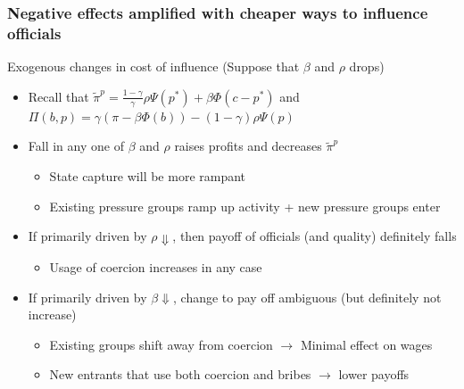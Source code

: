 \documentclass[aspectratio=169]{beamer}
\begin{document}
\begin{frame}
\frametitle{Negative effects amplified with cheaper ways to influence officials} 
Exogenous changes in cost of influence (Suppose that $\beta$ and $\rho$ drops)
\begin{itemize}\setlength\itemsep{3pt}
\item Recall that $\tilde{\pi}^p=\frac{1-\gamma}{\gamma}\rho\Psi(p^*)+\beta\Phi(c-p^*)$ and $\Pi(b,p)=\gamma(\pi-\beta\Phi(b))-(1-\gamma)\rho\Psi(p)$
\item Fall in any one of $\beta$  and $\rho$ raises profits and decreases $\tilde{\pi}^p$
\begin{itemize}\setlength\itemsep{3pt}
\item State capture will be more rampant 
\item Existing pressure groups ramp up activity + new pressure groups enter
\end{itemize}
\item If primarily driven by $\rho\Downarrow$, then payoff of officials (and quality) definitely falls
 \begin{itemize}\setlength\itemsep{3pt}
\item Usage of coercion increases in any case
\end{itemize}
\item If primarily driven by $\beta\Downarrow$, change to pay off ambiguous (but definitely not increase)
 \begin{itemize}\setlength\itemsep{3pt}
\item Existing groups shift away from coercion $\to$ Minimal effect on wages
\item New entrants that use both coercion and bribes $\to$ lower payoffs

\end{itemize}
\end{itemize}
\end{frame}
\end{document}
